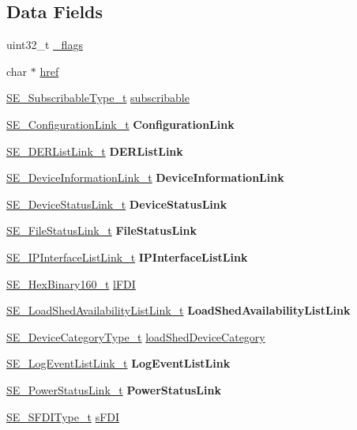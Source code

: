 \subsection*{Data Fields}
\begin{DoxyCompactItemize}
\item 
uint32\+\_\+t \hyperlink{group__AbstractDevice_gaebf23551088374995ff737d4849f46b7}{\+\_\+flags}
\item 
char $\ast$ \hyperlink{group__AbstractDevice_gaadb55d913e28d17f3600e87dea61959e}{href}
\item 
\hyperlink{group__SubscribableType_ga5c41f553d369710ed34619266bf2551e}{S\+E\+\_\+\+Subscribable\+Type\+\_\+t} \hyperlink{group__AbstractDevice_ga45b4dabefeecfb3f2e517060d8e025b6}{subscribable}
\item 
\hyperlink{structSE__ConfigurationLink__t}{S\+E\+\_\+\+Configuration\+Link\+\_\+t} {\bfseries Configuration\+Link}
\item 
\hyperlink{structSE__DERListLink__t}{S\+E\+\_\+\+D\+E\+R\+List\+Link\+\_\+t} {\bfseries D\+E\+R\+List\+Link}
\item 
\hyperlink{structSE__DeviceInformationLink__t}{S\+E\+\_\+\+Device\+Information\+Link\+\_\+t} {\bfseries Device\+Information\+Link}
\item 
\hyperlink{structSE__DeviceStatusLink__t}{S\+E\+\_\+\+Device\+Status\+Link\+\_\+t} {\bfseries Device\+Status\+Link}
\item 
\hyperlink{structSE__FileStatusLink__t}{S\+E\+\_\+\+File\+Status\+Link\+\_\+t} {\bfseries File\+Status\+Link}
\item 
\hyperlink{structSE__IPInterfaceListLink__t}{S\+E\+\_\+\+I\+P\+Interface\+List\+Link\+\_\+t} {\bfseries I\+P\+Interface\+List\+Link}
\item 
\hyperlink{group__HexBinary160_ga92b92aa55555bdb75f3a59060f2c1632}{S\+E\+\_\+\+Hex\+Binary160\+\_\+t} \hyperlink{group__AbstractDevice_ga96f19b4ecd35a06cd9cdce0c1a78a340}{l\+F\+DI}
\item 
\hyperlink{structSE__LoadShedAvailabilityListLink__t}{S\+E\+\_\+\+Load\+Shed\+Availability\+List\+Link\+\_\+t} {\bfseries Load\+Shed\+Availability\+List\+Link}
\item 
\hyperlink{group__DeviceCategoryType_gafc136ae19a3dd5b2fd2265d848ddeb2f}{S\+E\+\_\+\+Device\+Category\+Type\+\_\+t} \hyperlink{group__AbstractDevice_ga865ceb516365a2ee32b0c7bfe114dbc0}{load\+Shed\+Device\+Category}
\item 
\hyperlink{structSE__LogEventListLink__t}{S\+E\+\_\+\+Log\+Event\+List\+Link\+\_\+t} {\bfseries Log\+Event\+List\+Link}
\item 
\hyperlink{structSE__PowerStatusLink__t}{S\+E\+\_\+\+Power\+Status\+Link\+\_\+t} {\bfseries Power\+Status\+Link}
\item 
\hyperlink{group__SFDIType_ga08ad209b3cfce51cbdc450d1d35a1045}{S\+E\+\_\+\+S\+F\+D\+I\+Type\+\_\+t} \hyperlink{group__AbstractDevice_ga696fa49a4a1e6f84ad0ebe683906fa77}{s\+F\+DI}
\end{DoxyCompactItemize}


